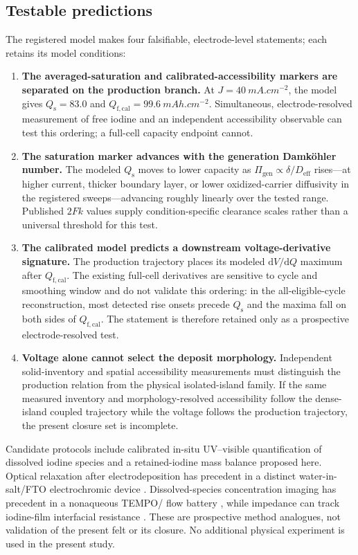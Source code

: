 \documentclass[11pt]{article}
\newcommand{\Deff}{D_{\mathrm{eff}}}
\newcommand{\Qfcal}{Q_{\mathrm{f,cal}}}
\begin{document}
\subsection{Testable predictions}
\label{sec:predictions}
The registered model makes four falsifiable, electrode-level statements; each retains its model conditions:
\begin{enumerate}
\item \textbf{The averaged-saturation and calibrated-accessibility markers are separated on the production
branch.} At
$J=\SI{40}{mA.cm^{-2}}$, the model gives $Q_{\mathrm s}=83.0$ and
$\Qfcal=99.6~\si{mAh.cm^{-2}}$. Simultaneous, electrode-resolved measurement of free iodine and an independent
accessibility observable can test this ordering; a full-cell capacity endpoint cannot.
\item \textbf{The saturation marker advances with the generation Damk\"ohler number.} The modeled $Q_{\mathrm s}$
moves to lower capacity as $\Pi_{\mathrm{gen}}\propto\delta/\Deff$ rises---at higher current, thicker
boundary layer, or lower oxidized-carrier diffusivity in the registered sweeps---advancing roughly
linearly over the tested range. Published $2Fk$ values supply condition-specific clearance scales rather than
a universal threshold for this test.
\item \textbf{The calibrated model predicts a downstream voltage-derivative signature.}
The production trajectory places its modeled $\mathrm{d}V/\mathrm{d}Q$ maximum after $\Qfcal$. The existing
full-cell derivatives are sensitive to cycle and smoothing window and do not validate this ordering: in the
all-eligible-cycle reconstruction, most detected rise onsets precede $Q_{\mathrm s}$ and the maxima fall on
both sides of $\Qfcal$. The statement is therefore retained only as a prospective electrode-resolved test.
\item \textbf{Voltage alone cannot select the deposit morphology.} Independent solid-inventory and spatial
accessibility measurements must distinguish the production relation from the physical isolated-island family.
If the same measured inventory and morphology-resolved accessibility follow the dense-island coupled
trajectory while the voltage follows the production trajectory, the present closure set is incomplete.
\end{enumerate}
Candidate protocols include calibrated in-situ UV--visible quantification of dissolved iodine species
\citep{ZnNC_AEL2025,WangNatCommun2025PSI} and a retained-iodine mass balance proposed here. Optical relaxation
after electrodeposition has precedent in a distinct  water-in-salt/FTO electrochromic device
\citep{SolidIodineElectrodeposition2025}. Dissolved-species concentration imaging has precedent in a
nonaqueous TEMPO/ flow battery \citep{Jacquemond2024}, while impedance can track iodine-film
interfacial resistance \citep{Jang2021}. These are prospective method analogues, not validation of the present
felt or its closure. No additional physical experiment is used in the present study.
\end{document}
